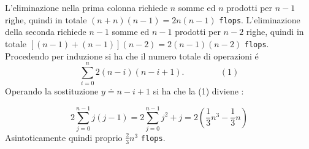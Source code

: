 L'eliminazione nella prima colonna richiede $n$ somme ed $n$ prodotti per $n-1$ righe, quindi in totale $(n+n)(n-1) = 2n(n-1)$ \texttt{flops}. L'eliminazione della seconda richiede $n-1$ somme ed $n-1$ prodotti per $n-2$ righe, quindi in totale $[(n-1)+(n-1)](n-2) = 2(n-1)(n-2)$ \texttt{flops}.\\
Procedendo per induzione si ha che il numero totale di operazioni \'e
\[
\sum_{i=0}^{n} 2(n-i)(n-i+1). \hspace{50pt} (1)
\]
Operando la sostituzione $y \doteq n-i+1$ si ha che la (1) diviene :

\[
2 \sum_{j=0}^{n-1} j(j-1) = 2 \sum_{j=0}^{n-1}j^2 + j = 2 ( \frac{1}{3}n^3 - \frac{1}{3}n)
\]
Asintoticamente quindi proprio $\frac{2}{3}n^3$ \texttt{flops}.

